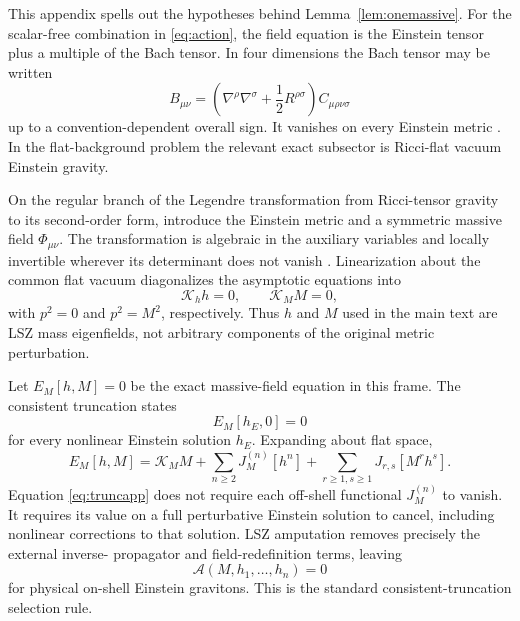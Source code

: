\documentclass[11pt]{article}
\theoremstyle{definition}
\theoremstyle{remark}
\begin{document}
This appendix spells out the hypotheses behind
Lemma~\ref{lem:onemassive}.  For the scalar-free combination in
\eqref{eq:action}, the field equation is the Einstein tensor plus a
multiple of the Bach tensor.  In four dimensions the Bach tensor may be
written
\begin{equation}
B_{\mu\nu}=\left(\nabla^\rho\nabla^\sigma
+\frac12R^{\rho\sigma}\right)C_{\mu\rho\nu\sigma}
\end{equation}
up to a convention-dependent overall sign.  It vanishes on every
Einstein metric \cite{LiuLuPope}.  In the flat-background problem the
relevant exact subsector is Ricci-flat vacuum Einstein gravity.

On the regular branch of the Legendre transformation from Ricci-tensor
gravity to its second-order form, introduce the Einstein metric and a
symmetric massive field $\Phi_{\mu\nu}$.  The transformation is algebraic
in the auxiliary variables and locally invertible wherever its determinant
does not vanish \cite{MagnanoSokolowski}.  Linearization about the common
flat vacuum diagonalizes the asymptotic equations into
\begin{equation}
\mathcal K_hh=0,
\qquad
\mathcal K_MM=0,
\end{equation}
with $p^2=0$ and $p^2=M^2$, respectively.  Thus $h$ and $M$ used in the
main text are LSZ mass eigenfields, not arbitrary components of the
original metric perturbation.

Let $E_M[h,M]=0$ be the exact massive-field equation in this frame.  The
consistent truncation states
\begin{equation}\label{eq:truncapp}
E_M[h_E,0]=0
\end{equation}
for every nonlinear Einstein solution $h_E$.  Expanding about flat space,
\begin{equation}
E_M[h,M]=\mathcal K_MM+
\sum_{n\ge2}J_M^{(n)}[h^n]
+\sum_{r\ge1,s\ge1}J_{r,s}[M^rh^s].
\end{equation}
Equation \eqref{eq:truncapp} does not require each off-shell functional
$J_M^{(n)}$ to vanish.  It requires its value on a full perturbative
Einstein solution to cancel, including nonlinear corrections to that
solution.  LSZ amputation removes precisely the external inverse-
propagator and field-redefinition terms, leaving
\begin{equation}
\mathcal A(M,h_1,\ldots,h_n)=0
\end{equation}
for physical on-shell Einstein gravitons.  This is the standard
consistent-truncation selection rule.
\end{document}

